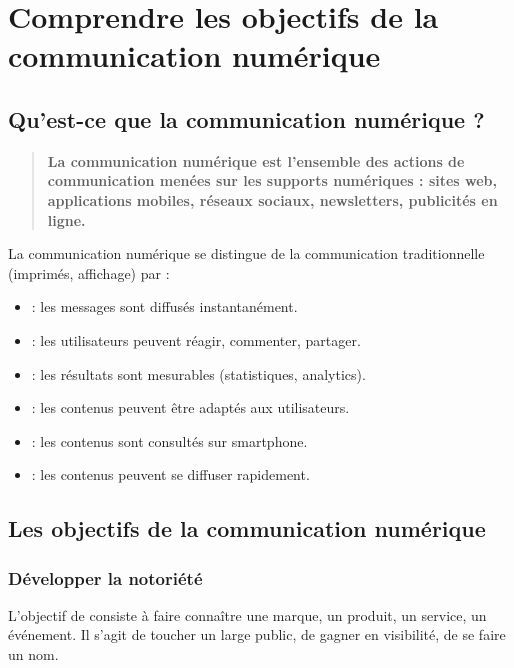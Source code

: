 \section{Comprendre les objectifs de la communication numérique}

\subsection{Qu'est-ce que la communication numérique ?}

\begin{quote}
\textbf{La communication numérique est l'ensemble des actions de communication menées sur les supports numériques : sites web, applications mobiles, réseaux sociaux, newsletters, publicités en ligne.}
\end{quote}

La communication numérique se distingue de la communication traditionnelle (imprimés, affichage) par :

\begin{itemize}
    \item {} : les messages sont diffusés instantanément.
    \item {} : les utilisateurs peuvent réagir, commenter, partager.
    \item {} : les résultats sont mesurables (statistiques, analytics).
    \item {} : les contenus peuvent être adaptés aux utilisateurs.
    \item {} : les contenus sont consultés sur smartphone.
    \item {} : les contenus peuvent se diffuser rapidement.
\end{itemize}

\subsection{Les objectifs de la communication numérique}

\subsubsection{Développer la notoriété}

L'objectif de  consiste à faire connaître une marque, un produit, un service, un événement. Il s'agit de toucher un large public, de gagner en visibilité, de se faire un nom.

